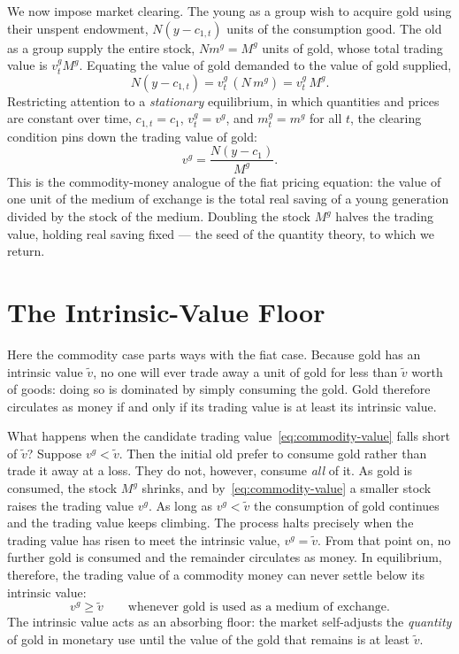 We now impose market clearing. The young as a group wish to acquire gold using their unspent endowment, $N(y - c_{1,t})$ units of the consumption good. The old as a group supply the entire stock, $N m^g = M^g$ units of gold, whose total trading value is $v^g_t M^g$. Equating the value of gold demanded to the value of gold supplied,
\[
N(y - c_{1,t}) = v^g_t \, (N\, m^g) = v^g_t\, M^g.
\]
Restricting attention to a \emph{stationary} equilibrium, in which quantities and prices are constant over time, $c_{1,t} = c_1$, $v^g_t = v^g$, and $m^g_t = m^g$ for all $t$, the clearing condition pins down the trading value of gold:
\begin{equation}
v^g = \frac{N(y - c_1)}{M^g}.
\label{eq:commodity-value}
\end{equation}
This is the commodity-money analogue of the fiat pricing equation: the value of one unit of the medium of exchange is the total real saving of a young generation divided by the stock of the medium. Doubling the stock $M^g$ halves the trading value, holding real saving fixed --- the seed of the quantity theory, to which we return.

\section{The Intrinsic-Value Floor}
\label{sec:floor}

Here the commodity case parts ways with the fiat case. Because gold has an intrinsic value $\tilde v$, no one will ever trade away a unit of gold for less than $\tilde v$ worth of goods: doing so is dominated by simply consuming the gold. Gold therefore circulates as money if and only if its trading value is at least its intrinsic value.


What happens when the candidate trading value~\eqref{eq:commodity-value} falls short of $\tilde v$? Suppose $v^g < \tilde v$. Then the initial old prefer to consume gold rather than trade it away at a loss. They do not, however, consume \emph{all} of it. As gold is consumed, the stock $M^g$ shrinks, and by~\eqref{eq:commodity-value} a smaller stock raises the trading value $v^g$. As long as $v^g < \tilde v$ the consumption of gold continues and the trading value keeps climbing. The process halts precisely when the trading value has risen to meet the intrinsic value, $v^g = \tilde v$. From that point on, no further gold is consumed and the remainder circulates as money. In equilibrium, therefore, the trading value of a commodity money can never settle below its intrinsic value:
\[
v^g \ge \tilde v
\qquad\text{whenever gold is used as a medium of exchange.}
\]
The intrinsic value acts as an absorbing floor: the market self-adjusts the \emph{quantity} of gold in monetary use until the value of the gold that remains is at least $\tilde v$.

